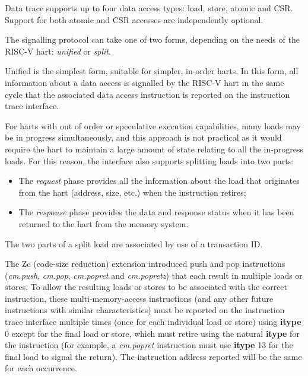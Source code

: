 Data trace supports up to four data access types: load, store, atomic and CSR.  
Support for both atomic and CSR accesses are independently optional.

The signalling protocol can take one of two forms, depending on the needs of the RISC-V 
hart: \textit{unified} or \textit{split}.

Unified is the simplest form, suitable for simpler, in-order harts.  In this form, all
information about a data access is signalled by the RISC-V hart in the
same cycle that the associated data access instruction is reported on the instruction
trace interface.  

For harts with out of order or speculative execution capabilities, many loads may be in 
progress simultaneously, and this approach is not practical as it would require the hart 
to maintain a large amount of state relating to all the in-progress loads.  For this 
reason, the interface also supports splitting loads into two parts:

\begin{itemize}
  \item The \textit{request} phase provides all the information about the load that
    originates from the hart (address, size, etc.) when the instruction retires;
  \item The \textit{response} phase provides the data and response status when it has
    been returned to the hart from the memory system.
\end{itemize}

The two parts of a split load are associated by use of a transaction ID.

The Zc (code-size reduction) extension introduced push and pop instructions
(\textit{cm.push}, \textit{cm.pop}, \textit{cm.popret} and \textit{cm.popretz})
that each result in multiple loads or stores.  To allow the resulting loads
or stores to be associated with the correct instruction, these multi-memory-access 
instructions (and any other future instructions with similar characteristics)
must be reported on the instruction trace interface multiple times (once for each 
individual load or store) using \textbf{itype} 0 except for the final load or store,
which must retire using the natural \textbf{itype} for the instruction
(for example, a \textit{cm.popret} instruction must use \textbf{itype} 13 for the
final load to signal the return).  The instruction address reported will be the same for
each occurrence.  

